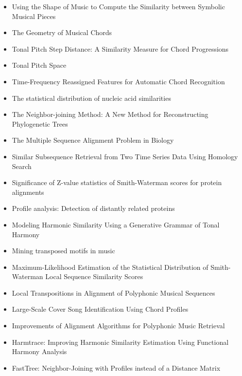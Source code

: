 \begin{itemize}
\item Using the Shape of Music to Compute the Similarity between Symbolic Musical Pieces \cite{urbano2010using}
\item The Geometry of Musical Chords \cite{Tymoczko_2006}
\item Tonal Pitch Step Distance: A Similarity Measure for Chord Progressions \cite{de2008tonal}
\item Tonal Pitch Space \cite{lerdahl1988tonal}
\item Time-Frequency Reassigned Features for Automatic Chord Recognition \cite{khadkevich2011time}
\item The statistical distribution of nucleic acid similarities \cite{smith1985statistical}
\item The Neighbor-joining Method: A New Method for Reconstructing Phylogenetic Trees \cite{saitou1987neighbor}
\item The Multiple Sequence Alignment Problem in Biology \cite{carrillo1988multiple}
\item Similar Subsequence Retrieval from Two Time Series Data Using Homology Search \cite{nishii2010similar}
\item Significance of Z-value statistics of Smith-Waterman scores for protein alignments \cite{comet1999significance}
\item Profile analysis: Detection of distantly related proteins \cite{gribskov1987profile}
\item Modeling Harmonic Similarity Using a Generative Grammar of Tonal Harmony \cite{de2009modeling}
\item Mining transposed motifs in music \cite{jimenez2011mining}
\item Maximum-Likelihood Estimation of the Statistical Distribution of Smith-Waterman Local Sequence Similarity Scores \cite{mott1992maximum}
\item Local Transpositions in Alignment of Polyphonic Musical Sequences \cite{allali2007local}
\item Large-Scale Cover Song Identification Using Chord Profiles \cite{khadkevich2013large}
\item Improvements of Alignment Algorithms for Polyphonic Music Retrieval \cite{hanna2008improvements}
\item Harmtrace: Improving Harmonic Similarity Estimation Using Functional Harmony Analysis \cite{de2011harmtrace}
\item FastTree: Neighbor-Joining with Profiles instead of a Distance Matrix \cite{price2009fasttree}

\end{itemize}
